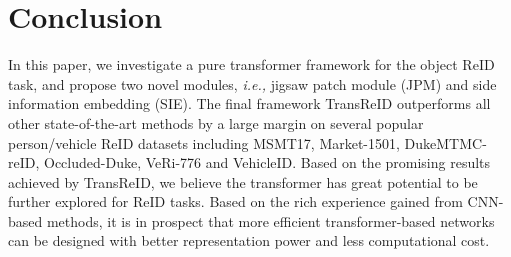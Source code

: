 \documentclass[10pt,twocolumn,letterpaper]{article}
\begin{document}
\section{Conclusion}

In this paper, we investigate a pure transformer framework for the object ReID task, and propose two novel modules, \textit{i.e.,} jigsaw patch module (JPM) and side information embedding (SIE). The final framework TransReID outperforms all other state-of-the-art methods by a large margin on several popular person/vehicle ReID datasets including MSMT17, Market-1501, DukeMTMC-reID, Occluded-Duke, VeRi-776 and VehicleID.
Based on the promising results achieved by TransReID, we believe the transformer has great potential to be further explored for ReID tasks. Based on the rich experience gained from CNN-based methods, it is in prospect that more efficient transformer-based networks can be designed with better representation power and less computational cost. 
\clearpage

{\small


}

\clearpage


\appendix
\end{document}
